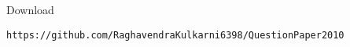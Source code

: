 \documentclass[journal,12pt,twocolumn]{IEEEtran}
\begin{document}
\maketitle
\newpage
\bigskip
\renewcommand{\thefigure}{\theenumi}
\renewcommand{\thetable}{\theenumi}
%
%
Download 
\begin{lstlisting}
https://github.com/RaghavendraKulkarni6398/QuestionPaper2010
\end{lstlisting}
\end{document}
